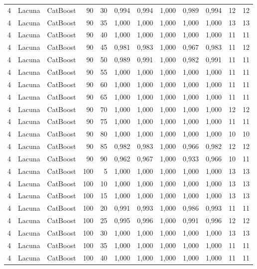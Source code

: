 \begin{longtable}{@{}rllrrrrrrrrr@{}}
4 & Lacuna & CatBoost & 90 & 30 & 0,994 & 0,994 & 1,000 & 0,989 & 0,994 & 12 & 12 \\
4 & Lacuna & CatBoost & 90 & 35 & 1,000 & 1,000 & 1,000 & 1,000 & 1,000 & 13 & 13 \\
4 & Lacuna & CatBoost & 90 & 40 & 1,000 & 1,000 & 1,000 & 1,000 & 1,000 & 11 & 11 \\
4 & Lacuna & CatBoost & 90 & 45 & 0,981 & 0,983 & 1,000 & 0,967 & 0,983 & 11 & 12 \\
4 & Lacuna & CatBoost & 90 & 50 & 0,989 & 0,991 & 1,000 & 0,982 & 0,991 & 11 & 11 \\
4 & Lacuna & CatBoost & 90 & 55 & 1,000 & 1,000 & 1,000 & 1,000 & 1,000 & 11 & 11 \\
4 & Lacuna & CatBoost & 90 & 60 & 1,000 & 1,000 & 1,000 & 1,000 & 1,000 & 11 & 11 \\
4 & Lacuna & CatBoost & 90 & 65 & 1,000 & 1,000 & 1,000 & 1,000 & 1,000 & 11 & 11 \\
4 & Lacuna & CatBoost & 90 & 70 & 1,000 & 1,000 & 1,000 & 1,000 & 1,000 & 12 & 12 \\
4 & Lacuna & CatBoost & 90 & 75 & 1,000 & 1,000 & 1,000 & 1,000 & 1,000 & 11 & 11 \\
4 & Lacuna & CatBoost & 90 & 80 & 1,000 & 1,000 & 1,000 & 1,000 & 1,000 & 10 & 10 \\
4 & Lacuna & CatBoost & 90 & 85 & 0,982 & 0,983 & 1,000 & 0,966 & 0,982 & 12 & 12 \\
4 & Lacuna & CatBoost & 90 & 90 & 0,962 & 0,967 & 1,000 & 0,933 & 0,966 & 10 & 11 \\
4 & Lacuna & CatBoost & 100 & 5 & 1,000 & 1,000 & 1,000 & 1,000 & 1,000 & 13 & 13 \\
4 & Lacuna & CatBoost & 100 & 10 & 1,000 & 1,000 & 1,000 & 1,000 & 1,000 & 13 & 13 \\
4 & Lacuna & CatBoost & 100 & 15 & 1,000 & 1,000 & 1,000 & 1,000 & 1,000 & 13 & 13 \\
4 & Lacuna & CatBoost & 100 & 20 & 0,991 & 0,993 & 1,000 & 0,986 & 0,993 & 11 & 11 \\
4 & Lacuna & CatBoost & 100 & 25 & 0,995 & 0,996 & 1,000 & 0,991 & 0,996 & 12 & 12 \\
4 & Lacuna & CatBoost & 100 & 30 & 1,000 & 1,000 & 1,000 & 1,000 & 1,000 & 13 & 13 \\
4 & Lacuna & CatBoost & 100 & 35 & 1,000 & 1,000 & 1,000 & 1,000 & 1,000 & 11 & 11 \\
4 & Lacuna & CatBoost & 100 & 40 & 1,000 & 1,000 & 1,000 & 1,000 & 1,000 & 11 & 11 \\

\end{longtable}
